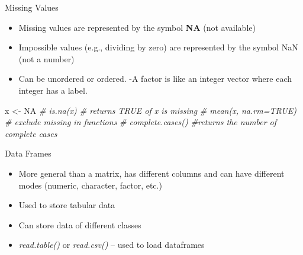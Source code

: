 \documentclass[
  ignorenonframetext,
]{beamer}
\newenvironment{Shaded}{\begin{snugshade}}{\end{snugshade}}
\newcommand{\CommentTok}[1]{\textcolor[rgb]{0.56,0.35,0.01}{\textit{#1}}}
\newcommand{\NormalTok}[1]{#1}
\newcommand{\OtherTok}[1]{\textcolor[rgb]{0.56,0.35,0.01}{#1}}
\newcommand{\StringTok}[1]{\textcolor[rgb]{0.31,0.60,0.02}{#1}}
\providecommand{\tightlist}{%
  \setlength{\itemsep}{0pt}\setlength{\parskip}{0pt}}
\begin{document}
\begin{frame}[fragile]{Missing Values}
\protect\hypertarget{missing-values}{}

\begin{itemize}
\item
  Missing values are represented by the symbol \textbf{NA} (not
  available)
\item
  Impossible values (e.g., dividing by zero) are represented by the
  symbol NaN (not a number)
\item
  Can be unordered or ordered. -A factor is like an integer vector where
  each integer has a label.
\end{itemize}

\begin{Shaded}
\begin{Highlighting}[]
\NormalTok{  x <-}\StringTok{ }\OtherTok{NA}
 \CommentTok{# is.na(x) # returns TRUE of x is missing}
\CommentTok{# mean(x, na.rm=TRUE) # exclude missing in functions}
\CommentTok{# complete.cases() #returns the number of complete cases}
\end{Highlighting}
\end{Shaded}

\end{frame}

\begin{frame}{Data Frames}
\protect\hypertarget{data-frames}{}

\begin{itemize}
\tightlist
\item
  More general than a matrix, has different columns and can have
  different modes (numeric, character, factor, etc.)
\item
  Used to store tabular data
\item
  Can store data of different classes
\item
  \emph{read.table()} or \emph{read.csv()} -- used to load dataframes
\end{itemize}

\end{frame}
\end{document}
